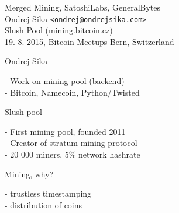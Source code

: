\documentclass{beamer}
\begin{document}
\begin{frame}

    {\LARGE Merged Mining, SatoshiLabs, GeneralBytes}\\
    \vspace{7mm}
    {\Large Ondrej Sika \lstinline|<ondrej@ondrejsika.com>|}\\
    \vspace{7mm}
    {\large Slush Pool (\url{mining.bitcoin.cz})}\\
    \vspace{7mm}
    19. 8. 2015, Bitcoin Meetups Bern, Switzerland\\

\end{frame}

\begin{frame}

    {\LARGE Ondrej Sika}\\

    \vspace{5mm}

    - Work on mining pool (backend)\\
    - Bitcoin, Namecoin, Python/Twisted\\

    \vspace{10mm}

    {\LARGE Slush pool}\\

    \vspace{5mm}

    - First mining pool, founded 2011\\
    - Creator of stratum mining protocol\\
    - 20 000 miners, 5\% network hashrate\\

\end{frame}

\begin{frame}

    {\LARGE Mining, why?}\\

    \vspace{5mm}

    - trustless timestamping\\
    - distribution of coins\\

\end{frame}
\end{document}
